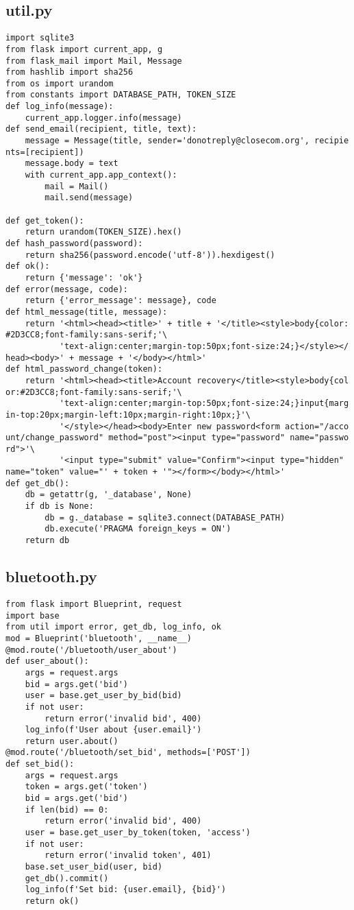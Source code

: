 \documentclass[listing]{espd}
\begin{document}
\subsection{util.py}
\begin{verbatim}
import sqlite3
from flask import current_app, g
from flask_mail import Mail, Message
from hashlib import sha256
from os import urandom
from constants import DATABASE_PATH, TOKEN_SIZE
def log_info(message):
    current_app.logger.info(message)
def send_email(recipient, title, text):
    message = Message(title, sender='donotreply@closecom.org', recipie
nts=[recipient])
    message.body = text
    with current_app.app_context():
        mail = Mail()
        mail.send(message)
    
def get_token():
    return urandom(TOKEN_SIZE).hex()
def hash_password(password):
    return sha256(password.encode('utf-8')).hexdigest()
def ok():
    return {'message': 'ok'}
def error(message, code):
    return {'error_message': message}, code
def html_message(title, message):
    return '<html><head><title>' + title + '</title><style>body{color:
#2D3CC8;font-family:sans-serif;'\
           'text-align:center;margin-top:50px;font-size:24;}</style></
head><body>' + message + '</body></html>'
def html_password_change(token):
    return '<html><head><title>Account recovery</title><style>body{col
or:#2D3CC8;font-family:sans-serif;'\
           'text-align:center;margin-top:50px;font-size:24;}input{marg
in-top:20px;margin-left:10px;margin-right:10px;}'\
           '</style></head><body>Enter new password<form action="/acco
unt/change_password" method="post"><input type="password" name="passwo
rd">'\
           '<input type="submit" value="Confirm"><input type="hidden" 
name="token" value="' + token + '"></form></body></html>'
def get_db():
    db = getattr(g, '_database', None)
    if db is None:
        db = g._database = sqlite3.connect(DATABASE_PATH)
        db.execute('PRAGMA foreign_keys = ON')
    return db
\end{verbatim}

\subsection{bluetooth.py}
\begin{verbatim}
from flask import Blueprint, request
import base
from util import error, get_db, log_info, ok
mod = Blueprint('bluetooth', __name__)
@mod.route('/bluetooth/user_about')
def user_about():
    args = request.args
    bid = args.get('bid')
    user = base.get_user_by_bid(bid)
    if not user:
        return error('invalid bid', 400)
    log_info(f'User about {user.email}')
    return user.about()
@mod.route('/bluetooth/set_bid', methods=['POST'])
def set_bid():
    args = request.args
    token = args.get('token')
    bid = args.get('bid')
    if len(bid) == 0:
        return error('invalid bid', 400)
    user = base.get_user_by_token(token, 'access')
    if not user:
        return error('invalid token', 401)
    base.set_user_bid(user, bid)
    get_db().commit()
    log_info(f'Set bid: {user.email}, {bid}')
    return ok()
\end{verbatim}
\end{document}
